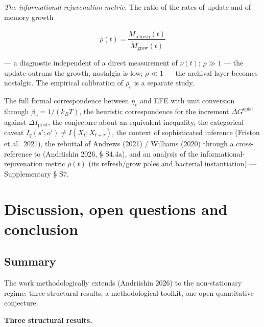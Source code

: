 \documentclass[pdflatex,sn-mathphys-ay]{sn-jnl}
\begin{document}
\emph{The informational rejuvenation metric.} The ratio of the rates of update and of memory growth



\begin{equation}\rho(t) = \frac{\dot{M}_{\text{refresh}}(t)}{\dot{M}_{\text{grow}}(t)} \tag{13}\end{equation}



--- a diagnostic independent of a direct measurement of \(\nu(t)\): \(\rho \gg 1\) --- the update outruns the growth, nostalgia is low; \(\rho \ll 1\) --- the archival layer becomes nostalgic. The empirical calibration of \(\rho_c\) is a separate study.



The full formal correspondence between \(\eta_v\) and EFE with unit conversion through \(\beta_v = 1/(k_B T)\), the heuristic correspondence for the increment \(\Delta G^{\text{epist}}\) against \(\Delta I_{\text{pred}}\), the conjecture about an equivalent inequality, the categorical caveat \(I_q(s'; o') \ne I(X_t; X_{t+\tau})\), the context of sophisticated inference (Friston et al.~2021), the rebuttal of Andrews (2021) / Williams (2020) through a cross-reference to (Andriishin 2026, § S4.4a), and an analysis of the informational-rejuvenation metric \(\rho(t)\) (its refresh/grow poles and bacterial instantiation) --- Supplementary § S7.



\section{Discussion, open questions and conclusion}\label{discussion-open-questions-and-conclusion}



\subsection{Summary}\label{summary}



The work methodologically extends (Andriishin 2026) to the non-stationary regime: three structural results, a methodological toolkit, one open quantitative conjecture.



\textbf{Three structural results.}
\end{document}
